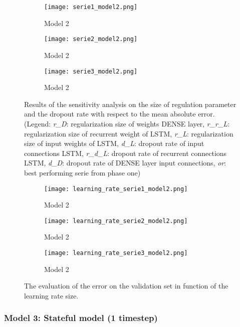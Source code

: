 \begin{figure}[ht]
	\centering
	\begin{subfigure}{0.49\linewidth}
		\texttt{[image: serie1\_model2.png]}
		\caption{Model 2}
	\end{subfigure}	
	\begin{subfigure}{0.49\linewidth}
		\texttt{[image: serie2\_model2.png]}
		\caption{Model 2}
	\end{subfigure}
	\begin{subfigure}{0.5\linewidth}
		\texttt{[image: serie3\_model2.png]}
		\caption{Model 2}
	\end{subfigure}
	\caption{Results of the sensitivity analysis on the size of regulation parameter and the dropout rate with respect to the mean absolute error.(Legend: \textit{r\_D}: regularization size of weights DENSE layer,  \textit{r\_r\_L}: regularization size of recurrent weight of LSTM, \textit{r\_L}: regularization size of input weights of LSTM, \textit{d\_L}: dropout rate of input connections LSTM, \textit{r\_d\_L}: dropout rate of recurrent connections LSTM, \textit{d\_D}: dropout rate of DENSE layer input connections, \textit{or}: best performing serie from phase one)}
	\label{fig:sensitivity_model2}
\end{figure}


\begin{figure}[h]
	\centering
	\begin{subfigure}{0.49\linewidth}
		\texttt{[image: learning\_rate\_serie1\_model2.png]}
		\caption{Model 2}
	\end{subfigure}	
	\begin{subfigure}{0.49\linewidth}
		\texttt{[image: learning\_rate\_serie2\_model2.png]}
		\caption{Model 2}
	\end{subfigure}
	\begin{subfigure}{0.5\linewidth}
		\texttt{[image: learning\_rate\_serie3\_model2.png]}
		\caption{Model 2}
	\end{subfigure}
	\caption{The evaluation of the error on the validation set in function of the learning rate size.}
	\label{fig:learning_rate_model1}
\end{figure}


\subsubsection{Model 3: Stateful model (1 timestep)}

